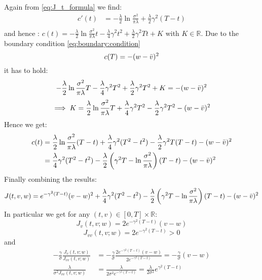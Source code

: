 \documentclass[oneside, a4paper, onecolumn, 11pt]{article}
\begin{document}
Again from \eqref{eq:J_t_formula} we find: 
\begin{align*}
c'(t) &= -\frac{\lambda}{2} \ln \frac{\sigma^2}{\pi \lambda} + \frac{\lambda}{2}\gamma^2(T-t) \\
\end{align*}
and hence : $c(t) = -\frac{\lambda}{2} \ln \frac{\sigma^2}{\pi\lambda} t  - \frac{\lambda}{4}\gamma^2 t^2 + \frac{\lambda}{2}\gamma^2T t + K $ with $K \in \mathbb{R}$. Due to the boundary condition \eqref{eq:boundary:condition}
\begin{equation*}
    c(T) = -(w - \Bar{v})^2 
\end{equation*}
it has to hold:
\begin{equation*}
    -\frac{\lambda}{2} \ln \frac{\sigma^2}{\pi \lambda} T - \frac{\lambda}{4}\gamma^2 T^2 + \frac{\lambda}{2}\gamma^2T^2 + K = -(w - \Bar{v})^2 
\end{equation*}
\begin{equation*}
   \implies K = \frac{\lambda}{2} \ln \frac{\sigma^2}{\pi \lambda} T + \frac{\lambda}{4}\gamma^2 T^2 - \frac{\lambda}{2}\gamma^2T^2 -(w - \Bar{v})^2 
\end{equation*}
Hence we get: 
\begin{align*}
c(t) &= \frac{\lambda}{2} \ln \frac{\sigma^2}{ \pi \lambda}(T-t) + \frac{\lambda}{4}\gamma^2 (T^2-t^2) - \frac{\lambda}{2}\gamma^2T(T-t) - (w- \Bar{v})^2 \\ 
    &= \frac{\lambda}{4}\gamma^2 (T^2-t^2) -\frac{\lambda}{2} \left(\gamma^2T-\ln \frac{\sigma^2}{\pi \lambda} \right)(T-t) - (w- \Bar{v})^2 
\end{align*}
Finally combining the results:  
\begin{equation}
   J(t,v,w) = e^{-\gamma^2(T-t)}(v-w)^2 + \frac{\lambda}{4}\gamma^2 (T^2-t^2) - \frac{\lambda}{2} \left( \gamma^2T - \ln \frac{\sigma^2}{\pi \lambda} \right)(T-t) - (w- \Bar{v})^2 
\end{equation}
In particular we get for any $(t,v) \in [0,T]\times \mathbb{R}$: 
\begin{equation}
    J_v(t,v;w) = 2 e^{-\gamma^2(T-t)} (v-w) 
\end{equation}
\begin{equation}
    J_{vv}(t,v;w) = 2 e^{-\gamma^2(T-t)} > 0 
\end{equation}
and
\begin{align}
-\frac{\gamma}{\sigma}\frac{J_v(t,v;w)}{J_{vv}(t,v;w)} &= -\frac{\gamma}{\sigma} \frac{2 e^{-\gamma^2(T-t)} (v-w) }{2 e^{-\gamma^2(T-t)}} = -\frac{\gamma}{\sigma}(v-w) \label{sol:mean}\\ 
\frac{\lambda}{\sigma^2 J_{vv}(t,v;w)} &= \frac{\lambda}{2 \sigma^2 e^{-\gamma^2(T-t)}}= \frac{\lambda}{2\sigma^2} e^{\gamma^2(T-t)} \label{sol:variance}
\end{align}
\end{document}

